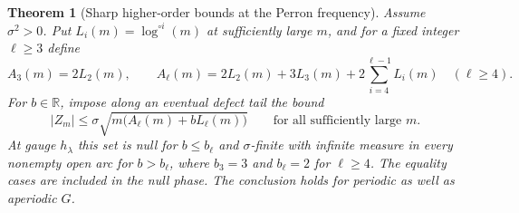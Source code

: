 \documentclass[11pt]{article}
\newtheorem{theorem}{Theorem}
\theoremstyle{definition}
\theoremstyle{remark}
\newcommand{\R}{\mathbb{R}}
\begin{document}
\begin{theorem}[Sharp higher-order bounds at the Perron frequency]
\label{thm:markov-upper-class}
Assume $\sigma^2>0$. Put $L_i(m)=\log^{\circ i}(m)$ at sufficiently
large $m$, and for a fixed integer $\ell\ge3$ define
\[
 A_3(m)=2L_2(m),\qquad
 A_\ell(m)=2L_2(m)+3L_3(m)+2\sum_{i=4}^{\ell-1}L_i(m)
       \quad(\ell\ge4).
\]
For $b\in\R$, impose along an eventual defect tail the bound
\[
 |Z_m|\le \sigma\sqrt{m\bigl(A_\ell(m)+bL_\ell(m)\bigr)}
                 \qquad\text{for all sufficiently large }m.
\]
At gauge $h_\lambda$ this set is null for $b\le b_\ell$ and
$\sigma$-finite with infinite measure in every nonempty open
arc for $b>b_\ell$, where $b_3=3$ and $b_\ell=2$ for $\ell\ge4$.
The equality cases are included in the null phase. The conclusion
holds for periodic as well as aperiodic $G$.
\end{theorem}
\end{document}
